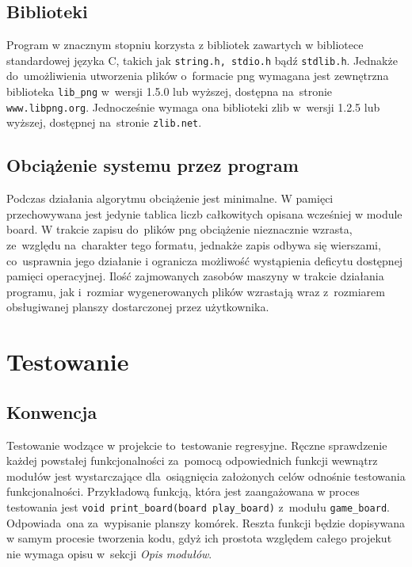 \documentclass[a4paper,11pt]{article}
\begin{document}
	  \subsection{Biblioteki}
	  Program w znacznym stopniu korzysta z bibliotek zawartych w bibliotece standardowej języka C, takich jak \texttt{string.h, stdio.h} bądź \texttt{stdlib.h}. Jednakże do~umożliwienia utworzenia plików o~formacie png wymagana jest zewnętrzna biblioteka \texttt{lib\_png} w~wersji 1.5.0 lub wyższej, dostępna na~stronie \texttt{www.libpng.org}. Jednocześnie wymaga ona biblioteki zlib w~wersji 1.2.5 lub wyższej, dostępnej na~stronie \texttt{zlib.net}.
	  \subsection{Obciążenie systemu przez program}
	  Podczas działania algorytmu obciążenie jest minimalne. W pamięci przechowywana jest jedynie tablica liczb całkowitych opisana wcześniej w module board. W trakcie zapisu do~plików png obciążenie nieznacznie wzrasta, ze~względu na~charakter tego formatu, jednakże zapis odbywa się wierszami, co~usprawnia jego działanie i ogranicza możliwość wystąpienia deficytu dostępnej pamięci operacyjnej. Ilość zajmowanych zasobów maszyny w trakcie działania programu, jak i~rozmiar wygenerowanych plików wzrastają wraz z~rozmiarem obsługiwanej planszy dostarczonej przez użytkownika. 
	  \newpage
	\section{Testowanie}
		\subsection{Konwencja}
		Testowanie wodzące w projekcie to~testowanie regresyjne. Ręczne sprawdzenie każdej powstałej funkcjonalności za~pomocą odpowiednich funkcji wewnątrz modułów jest wystarczające dla~osiągnięcia założonych celów odnośnie testowania funkcjonalności. Przykładową funkcją, która jest zaangażowana w proces testowania jest \texttt{void print\_board(board play\_board)} z~modułu \texttt{game\_board}. Odpowiada~ona za~wypisanie planszy komórek. Reszta funkcji będzie dopisywana w samym procesie tworzenia kodu, gdyż ich prostota względem całego projekut nie wymaga opisu w~sekcji \textsl{Opis modułów}.
\end{document}
